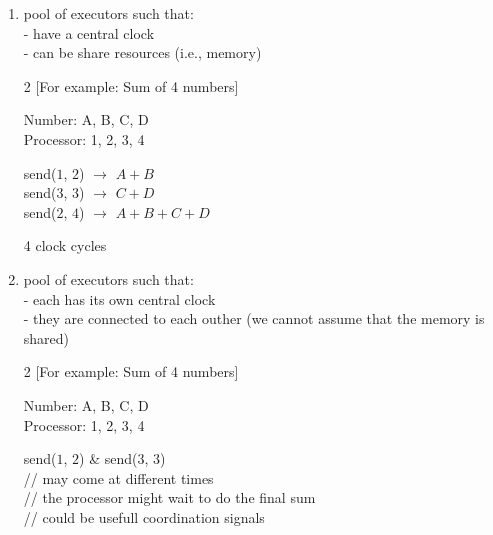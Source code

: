 \begin{enumerate}
 \item pool of executors such that:\\
 - have a central clock\\
 - can be share resources (i.e., memory)\\
 \begin{multicols}{2}
 [For example: Sum of 4 numbers]
		
   Number: A, B, C, D\\
   Processor: 1, 2, 3, 4\\
    \begin{algorithm}[H]
    	 \SetAlgoLined
     send($1$, $2$) $\rightarrow$ $A+B$\\
     send($3$, $3$) $\rightarrow$ $C+D$\\
     send($2$, $4$) $\rightarrow$ $A+B+C+D$
     \caption{Sum of 4}
	 \end{algorithm}
	 4 clock cycles
	\end{multicols}
 \item pool of executors such that:\\
 - each has its own central clock\\
 - they are connected to each outher (we cannot assume that the memory is shared)
 \begin{multicols}{2}
 [For example: Sum of 4 numbers]
		
  Number: A, B, C, D\\
  Processor: 1, 2, 3, 4\\
   \begin{algorithm}[H]
    	\SetAlgoLined
    send($1$, $2$) \& send($3$, $3$)\\
    // may come at different times\\
    // the processor might wait to do the final sum\\
    // could be usefull coordination signals
    \caption{Sum of 4}
   \end{algorithm}
 \end{multicols}
\end{enumerate}

